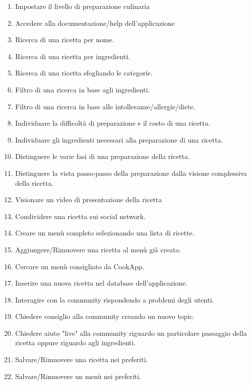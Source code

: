 \begin{enumerate}
\item Impostare il livello di preparazione culinaria
\item Accedere alla documentazione/help dell'applicazione

\item Ricerca di una ricetta per nome.
\item Ricerca di una ricetta per ingredienti.

\item Ricerca di una ricetta sfogliando le categorie.

\item Filtro di una ricerca in base agli ingredienti.
\item Filtro di una ricerca in base alle intolleranze/allergie/diete.

\item Individuare la difficoltà di preparazione e il costo di una ricetta.
\item Individuare gli ingredienti necessari alla preparazione di una ricetta.
\item Distinguere le varie fasi di una preparazione della ricetta.
\item Distinguere la vista passo-passo della preparazione dalla visione complessiva della ricetta.
\item Visionare un video di presentazione della ricetta
\item Condividere una ricetta sui social network.
\item Creare un menù completo selezionando una lista di ricette.
\item Aggiungere/Rimuovere una ricetta al menù già creato.
\item Cercare un menù consigliato da CookApp.

\item Inserire una nuova ricetta nel database dell'applicazione.
\item Interagire con la community rispondendo a problemi degli utenti.
\item Chiedere consiglio alla community creando un nuovo topic.
\item Chiedere aiuto "live" alla community riguardo un particolare
passaggio della ricetta oppure riguardo agli ingredienti.

\item Salvare/Rimuovere una ricetta nei preferiti.
\item Salvare/Rimuovere un menù nei preferiti.


\end{enumerate}
